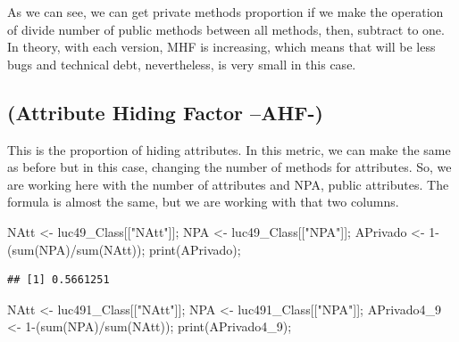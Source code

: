 \documentclass[
]{article}
\newenvironment{Shaded}{\begin{snugshade}}{\end{snugshade}}
\newcommand{\DecValTok}[1]{\textcolor[rgb]{0.00,0.00,0.81}{#1}}
\newcommand{\FunctionTok}[1]{\textcolor[rgb]{0.00,0.00,0.00}{#1}}
\newcommand{\NormalTok}[1]{#1}
\newcommand{\OtherTok}[1]{\textcolor[rgb]{0.56,0.35,0.01}{#1}}
\newcommand{\SpecialCharTok}[1]{\textcolor[rgb]{0.00,0.00,0.00}{#1}}
\newcommand{\StringTok}[1]{\textcolor[rgb]{0.31,0.60,0.02}{#1}}
\begin{document}
As we can see, we can get private methods proportion if we make the
operation of divide number of public methods between all methods, then,
subtract to one. In theory, with each version, MHF is increasing, which
means that will be less bugs and technical debt, nevertheless, is very
small in this case.

\hypertarget{attribute-hiding-factor-ahf-}{%
\subsection{(Attribute Hiding Factor
--AHF-)}\label{attribute-hiding-factor-ahf-}}

This is the proportion of hiding attributes. In this metric, we can make
the same as before but in this case, changing the number of methods for
attributes. So, we are working here with the number of attributes and
NPA, public attributes. The formula is almost the same, but we are
working with that two columns.

\begin{Shaded}
\begin{Highlighting}[]
\NormalTok{NAtt }\OtherTok{\textless{}{-}}\NormalTok{ luc49\_Class[[}\StringTok{"NAtt"}\NormalTok{]];}
\NormalTok{NPA }\OtherTok{\textless{}{-}}\NormalTok{ luc49\_Class[[}\StringTok{"NPA"}\NormalTok{]];}
\NormalTok{APrivado }\OtherTok{\textless{}{-}} \DecValTok{1}\SpecialCharTok{{-}}\NormalTok{(}\FunctionTok{sum}\NormalTok{(NPA)}\SpecialCharTok{/}\FunctionTok{sum}\NormalTok{(NAtt));}
\FunctionTok{print}\NormalTok{(APrivado);}
\end{Highlighting}
\end{Shaded}

\begin{verbatim}
## [1] 0.5661251
\end{verbatim}

\begin{Shaded}
\begin{Highlighting}[]
\NormalTok{NAtt }\OtherTok{\textless{}{-}}\NormalTok{ luc491\_Class[[}\StringTok{"NAtt"}\NormalTok{]];}
\NormalTok{NPA }\OtherTok{\textless{}{-}}\NormalTok{ luc491\_Class[[}\StringTok{"NPA"}\NormalTok{]];}
\NormalTok{APrivado4\_9 }\OtherTok{\textless{}{-}} \DecValTok{1}\SpecialCharTok{{-}}\NormalTok{(}\FunctionTok{sum}\NormalTok{(NPA)}\SpecialCharTok{/}\FunctionTok{sum}\NormalTok{(NAtt));}
\FunctionTok{print}\NormalTok{(APrivado4\_9);}
\end{Highlighting}
\end{Shaded}
\end{document}
